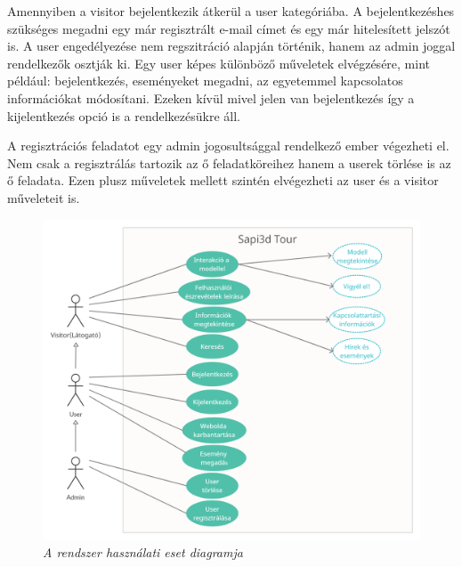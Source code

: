 Amennyiben a visitor bejelentkezik átkerül a user kategóriába. A bejelentkezéshes szükséges megadni egy már regisztrált e-mail címet és egy már hitelesített jelszót is. A user engedélyezése nem regszitráció alapján történik, hanem az admin joggal rendelkezők osztják ki. Egy user képes különböző műveletek elvégzésére, mint például: bejelentkezés, eseményeket megadni, az egyetemmel kapcsolatos információkat módosítani. Ezeken kívül mivel jelen van bejelentkezés így a kijelentkezés opció is a rendelkezésükre áll.

A regisztrációs feladatot egy admin jogosultsággal rendelkező ember végezheti el. Nem csak a regisztrálás tartozik az ő feladatköreihez hanem a userek törlése is az ő feladata. Ezen plusz műveletek mellett szintén elvégezheti az user és a visitor műveleteit is.
\begin{figure}[H]
	\centering
	\includegraphics[width=1\linewidth]{figures/images/Sapi3dTourUseCase.png}
	\caption[A rendszer használati eset diagramja]{\textit{A rendszer használati eset diagramja}}
	\label{fig:UseCase}
\end{figure}
\pagebreak